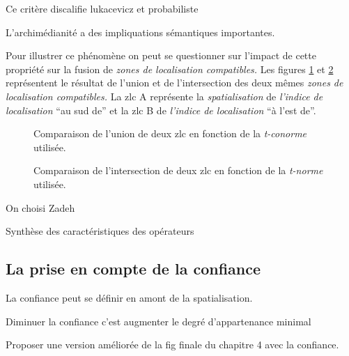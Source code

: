 Ce critère discalifie lukacevicz et probabiliste

L'archimédianité a des impliquations sémantiques importantes.

Pour illustrer ce phénomène on peut se questionner sur l'impact de
cette propriété sur la fusion de \emph{zones de localisation
  compatibles.}  Les figures \ref{fig:comparaison_operateurs_union} et
\ref{fig:comparaison_operateurs_intersection} représentent le résultat
de l'union et de l'intersection des deux mêmes \emph{zones de
  localisation compatibles.} La \ac{zlc}
\textcolor{RdBu-9-1}{\textsf{A}} représente la \emph{spatialisation}
de \emph{l'indice de localisation} \enquote{au sud de} et la \ac{zlc}
\textcolor{RdBu-9-9}{\textsf{B}} de \emph{l'indice de localisation}
\enquote{à l'est de}.

\begin{figure}
  \centering
  
  \caption{Comparaison de l'union de deux \ac{zlc} en fonction de la
    \emph{t-conorme} utilisée.}
  \label{fig:comparaison_operateurs_union}
\end{figure}

\begin{figure}
  \centering
  
  \caption{Comparaison de l'intersection de deux \ac{zlc} en fonction
    de la \emph{t-norme} utilisée.}
  \label{fig:comparaison_operateurs_intersection}
\end{figure}



On choisi Zadeh

\begin{table}
  \centering
  
  \caption{Synthèse des caractéristiques des opérateurs}
\end{table}



\subsection{La prise en compte de la confiance}

La confiance peut se définir en amont de la spatialisation.

Diminuer la confiance c'est augmenter le degré d'appartenance minimal

Proposer une version améliorée de la fig finale du chapitre 4 avec la
confiance.

